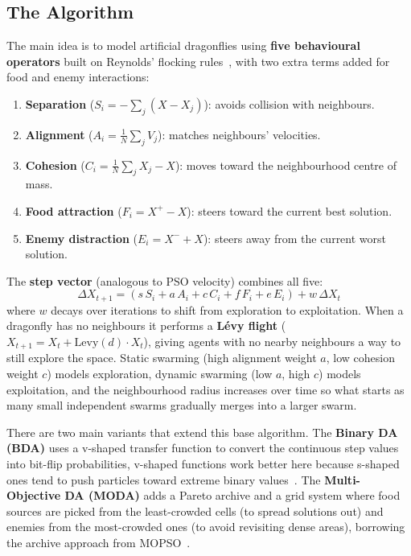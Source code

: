 \documentclass[11pt,a4paper]{article}
\begin{document}
\subsection*{The Algorithm}

The main idea is to model artificial dragonflies using \textbf{five behavioural
operators} built on Reynolds' flocking rules~\cite{reynolds1987flocks}, with two
extra terms added for food and enemy interactions:

\begin{enumerate}
    \item \textbf{Separation} ($S_i = -\sum_j (X - X_j)$): avoids collision with neighbours.
    \item \textbf{Alignment} ($A_i = \frac{1}{N}\sum_j V_j$): matches neighbours' velocities.
    \item \textbf{Cohesion} ($C_i = \frac{1}{N}\sum_j X_j - X$): moves toward the neighbourhood centre of mass.
    \item \textbf{Food attraction} ($F_i = X^+ - X$): steers toward the current best solution.
    \item \textbf{Enemy distraction} ($E_i = X^- + X$): steers away from the current worst solution.
\end{enumerate}

The \textbf{step vector} (analogous to PSO velocity) combines all five:
\[
    \Delta X_{t+1} = (s\,S_i + a\,A_i + c\,C_i + f\,F_i + e\,E_i) + w\,\Delta X_t
\]
where $w$ decays over iterations to shift from exploration to exploitation.
When a dragonfly has no neighbours it performs a \textbf{L\'{e}vy flight}
($X_{t+1} = X_t + \text{Levy}(d)\cdot X_t$), giving agents with no nearby neighbours a way to
still explore the space.
Static swarming (high alignment weight $a$, low cohesion weight $c$) models
exploration, dynamic swarming (low $a$, high $c$) models exploitation, and the
neighbourhood radius increases over time so what starts as many small independent
swarms gradually merges into a larger swarm.

There are two main variants that extend this base algorithm.
The \textbf{Binary DA (BDA)} uses a v-shaped transfer function to convert the
continuous step values into bit-flip probabilities, v-shaped functions work
better here because s-shaped ones tend to push particles toward extreme binary
values~\cite{saremi2014transfer}.
The \textbf{Multi-Objective DA (MODA)} adds a Pareto archive and a grid system
where food sources are picked from the least-crowded cells (to spread solutions
out) and enemies from the most-crowded ones (to avoid revisiting dense areas),
borrowing the archive approach from MOPSO~\cite{coello2004mopso}.
\end{document}
